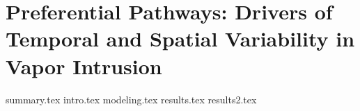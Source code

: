 \documentclass[../thesis.tex]{subfiles}
\begin{document}
\chapter{Preferential Pathways: Drivers of Temporal and Spatial Variability in Vapor Intrusion}\label{chp:preferential_pathways}

{summary.tex}
{intro.tex}
{modeling.tex}
{results.tex}
{results2.tex}
\end{document}

